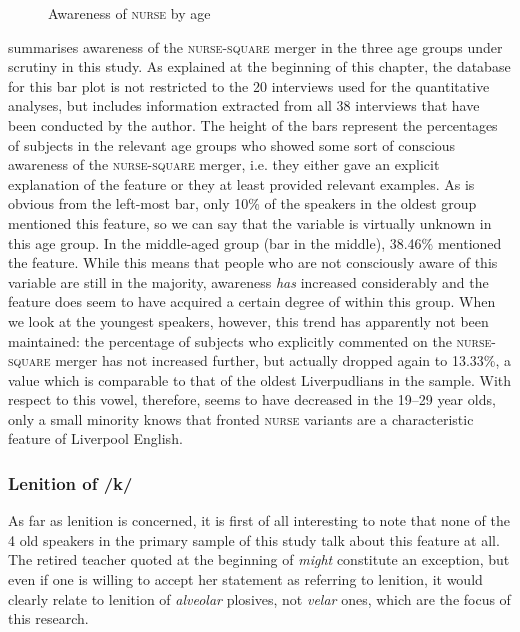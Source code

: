 \begin{figure}
	
		\resizebox{.49\linewidth}{!}{} 
	\caption{Awareness of \textsc{nurse} by age}
	\label{fig.aware.nurse}
\end{figure}

 summarises awareness of the \textsc{nurse}-\textsc{square} merger in the three age groups under scrutiny in this study.
As explained at the beginning of this chapter, the database for this bar plot is not restricted to the 20 interviews used for the quantitative analyses, but includes information extracted from all 38 interviews that have been conducted by the author.
The height of the bars represent the percentages of subjects in the relevant age groups who showed some sort of conscious awareness of the \textsc{nurse}-\textsc{square} merger, i.e. they either gave an explicit explanation of the feature or they at least provided relevant examples.
As is obvious from the left-most bar, only 10\% of the speakers in the oldest group mentioned this feature, so we can say that the variable is virtually unknown in this age group.
In the middle-aged group (bar in the middle), 38.46\% mentioned the feature.
While this means that people who are not consciously aware of this variable are still in the majority, awareness \emph{has} increased considerably and the feature does seem to have acquired a certain degree of  within this group.
When we look at the youngest speakers, however, this trend has apparently not been maintained: the percentage of subjects who explicitly commented on the \textsc{nurse}-\textsc{square} merger has not increased further, but actually dropped again to 13.33\%, a value which is comparable to that of the oldest Liverpudlians in the sample.
With respect to this vowel, therefore,  seems to have decreased in the 19--29 year olds, only a small minority knows that fronted \textsc{nurse} variants are a characteristic feature of Liverpool English.

\subsubsection{Lenition of /k/}
\label{aware_res.phon.k}

As far as lenition is concerned, it is first of all interesting to note that none of the 4 old speakers in the primary sample of this study talk about this feature at all.
The retired teacher quoted at the beginning of  \emph{might} constitute an exception, but even if one is willing to accept her statement as referring to lenition, it would clearly relate to lenition of \emph{alveolar} plosives, not \emph{velar} ones, which are the focus of this research.


